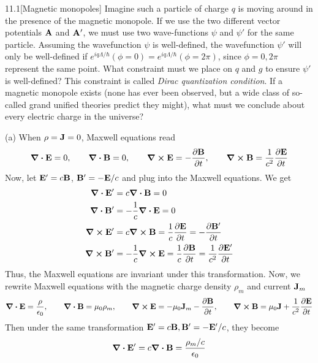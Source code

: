 \documentclass[12pt]{article}
\begin{document}
\begin{problem}{11.1}[Magnetic monopoles]
Imagine such a particle of charge $q$ is moving around in the presence of the
magnetic monopole. If we use the two different vector potentials $\vb{A}$ and
$\vb{A}'$, we must use two wave-functions $\psi$ and $\psi'$ for the same
particle. Assuming the wavefunction $\psi$ is well-defined, the wavefunction
$\psi'$ will only be well-defined if
$e^{iq\Lambda/\hbar}(\phi=0)=e^{iq\Lambda/\hbar}(\phi=2\pi)$, since
$\phi=0,2\pi$ represent the same point. What constraint must we place on $q$ and
$g$ to ensure $\psi'$ is well-defined? This constraint is called \textit{Dirac
quantization condition}. If a magnetic monopole exists (none has ever been
observed, but a wide class of so-called grand unified theories predict they
might), what must we conclude about every electric charge in the universe?
\begin{solution}
(a) When $\rho=\vb{J}=0$, Maxwell equations read
\begin{equation}
    \div{\vb{E}}=0,\qquad
    \div{\vb{B}}=0,\qquad
    \curl{\vb{E}}=-\frac{\partial\vb{B}}{\partial t},\qquad
    \curl{\vb{B}}=\frac1{c^2}\frac{\partial\vb{E}}{\partial t}
\end{equation}
Now, let $\vb{E}'=c\vb{B}$, $\vb{B}'=-\vb{E}/c$ and plug into the Maxwell
equations. We get
\begin{align}
    \div{\vb{E}'}&=c\div{\vb{B}}=0\notag\\
    \div{\vb{B}'}&=-\frac1c\div{\vb{E}}=0\notag\\
    \curl{\vb{E}'}&=c\curl{\vb{B}}=\frac1c\frac{\partial\vb{E}}{\partial t}
    =-\frac{\partial\vb{B}'}{\partial t}\notag\\
    \curl{\vb{B}'}&=-\frac1c\curl{\vb{E}}=\frac1c\frac{\partial\vb{B}}{\partial
    t}=\frac1{c^2}\frac{\partial\vb{E}'}{\partial t}
\end{align}
Thus, the Maxwell equations are invariant under this transformation. Now, we
rewrite Maxwell equations with the magnetic charge density $\rho_m$ and current
$\vb{J}_m$
\begin{equation}
    \div{\vb{E}}=\frac{\rho}{\epsilon_0},\qquad
    \div{\vb{B}}=\mu_0\rho_m,\qquad
    \curl{\vb{E}}=-\mu_0\vb{J}_m-\frac{\partial\vb{B}}{\partial t},\qquad
    \curl{\vb{B}}=\mu_0\vb{J}+\frac1{c^2}\frac{\partial\vb{E}}{\partial t}
\end{equation}
Then under the same transformation $\vb{E}'=c\vb{B},\vb{B}'=-\vb{E}'/c$, they
become
\begin{align}
    \div{\vb{E}'}&=c\div{\vb{B}}=\frac{\rho_m/c}{\epsilon_0}\notag\\

\end{align}
\end{solution}
\end{problem}
\end{document}
